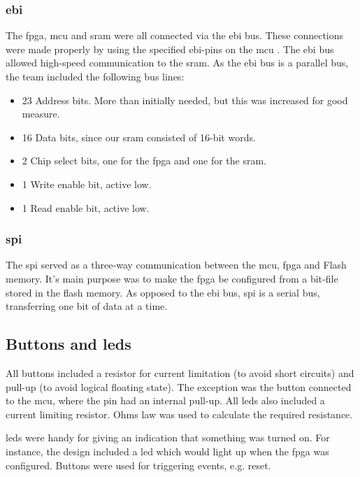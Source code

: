 \subsubsection{\gls{ebi}}
The \gls{fpga}, \gls{mcu} and \gls{sram} were all connected via the \gls{ebi} bus.
These connections were made properly by using the specified \gls{ebi}-pins on the \gls{mcu} \cite[sec. 4.1]{efm32-datasheet}.
The \gls{ebi} bus allowed high-speed communication to the \gls{sram}.
As the \gls{ebi} bus is a parallel bus, the team included the following bus lines:
\begin{itemize}
\item 23 Address bits. More than initially needed, but this was increased for good measure.
\item 16 Data bits, since our \gls{sram} consisted of 16-bit words.
\item 2 Chip select bits, one for the \gls{fpga} and one for the \gls{sram}.
\item 1 Write enable bit, active low.
\item 1 Read enable bit, active low.
\end{itemize}

\subsubsection{\gls{spi}}
The \gls{spi} served as a three-way communication between the \gls{mcu}, \gls{fpga} and Flash memory.
It's main purpose was to make the \gls{fpga} be configured from a bit-file stored in the flash memory.
As opposed to the \gls{ebi} bus, \gls{spi} is a serial bus, transferring one bit of data at a time.

\subsection{Buttons and \gls{led}s}
All buttons included a resistor for current limitation (to avoid short circuits) and pull-up (to avoid logical floating state).
The exception was the button connected to the \gls{mcu}, where the pin had an internal pull-up.
All \gls{led}s also included a current limiting resistor.
Ohms law was used to calculate the required resistance\cite{ohm}.

\gls{led}s were handy for giving an indication that something was turned on.
For instance, the design included a \gls{led} which would light up when the \gls{fpga} was configured.
Buttons were used for triggering events, e.g. reset.

